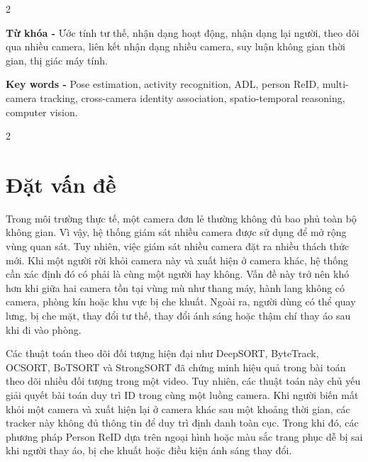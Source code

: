 \documentclass[a4paper, twoside, 12pt]{article}
\begin{document}
\vspace{0.2cm}

\begin{multicols}{2}

    \textbf{Từ khóa -} Ước tính tư thế, nhận dạng hoạt động, nhận dạng lại người, theo dõi qua nhiều camera, liên kết nhận dạng nhiều camera, suy luận không gian thời gian, thị giác máy tính.
    
    \columnbreak %
    \textbf{Key words -} Pose estimation, activity recognition, ADL, person ReID, multi-camera tracking, cross-camera identity association, spatio-temporal reasoning, computer vision.
\end{multicols}

\vspace{0.2cm}
\begin{multicols}{2}
\section{Đặt vấn đề}
\vspace{-0.56cm}
\hspace*{0.5cm}Trong môi trường thực tế, một camera đơn lẻ thường không đủ bao phủ toàn bộ không gian. Vì vậy, hệ thống giám sát nhiều camera được sử dụng để mở rộng vùng quan sát. Tuy nhiên, việc giám sát nhiều camera đặt ra nhiều thách thức mới. Khi một người rời khỏi camera này và xuất hiện ở camera khác, hệ thống cần xác định đó có phải là cùng một người hay không. Vấn đề này trở nên khó hơn khi giữa hai camera tồn tại vùng mù như thang máy, hành lang không có camera, phòng kín hoặc khu vực bị che khuất. Ngoài ra, người dùng có thể quay lưng, bị che mặt, thay đổi tư thế, thay đổi ánh sáng hoặc thậm chí thay áo sau khi đi vào phòng.

Các thuật toán theo dõi đối tượng hiện đại như DeepSORT, ByteTrack, OCSORT, BoTSORT và StrongSORT đã chứng minh hiệu quả trong bài toán theo dõi nhiều đối tượng trong một video. Tuy nhiên, các thuật toán này chủ yếu giải quyết bài toán duy trì ID trong cùng một luồng camera. Khi người biến mất khỏi một camera và xuất hiện lại ở camera khác sau một khoảng thời gian, các tracker này không đủ thông tin để duy trì định danh toàn cục. Trong khi đó, các phương pháp Person ReID dựa trên ngoại hình hoặc màu sắc trang phục dễ bị sai khi người thay áo, bị che khuất hoặc điều kiện ánh sáng thay đổi.

\end{multicols}
\end{document}
